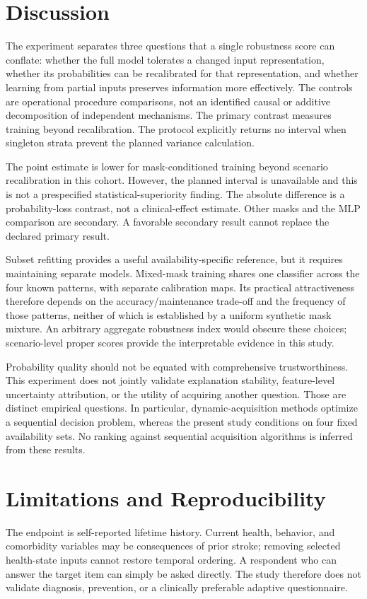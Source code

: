 \documentclass[conference,letterpaper]{IEEEtran}
\begin{document}
\section{Discussion}
The experiment separates three questions that a single robustness score can conflate: whether the full model tolerates a changed input representation, whether its probabilities can be recalibrated for that representation, and whether learning from partial inputs preserves information more effectively. The controls are operational procedure comparisons, not an identified causal or additive decomposition of independent mechanisms. The primary contrast measures training beyond recalibration. The protocol explicitly returns no interval when singleton strata prevent the planned variance calculation.

The point estimate is lower for mask-conditioned training beyond scenario recalibration in this cohort. However, the planned interval is unavailable and this is not a prespecified statistical-superiority finding. The absolute difference is a probability-loss contrast, not a clinical-effect estimate. Other masks and the MLP comparison are secondary. A favorable secondary result cannot replace the declared primary result.

Subset refitting provides a useful availability-specific reference, but it requires maintaining separate models. Mixed-mask training shares one classifier across the four known patterns, with separate calibration maps. Its practical attractiveness therefore depends on the accuracy/maintenance trade-off and the frequency of those patterns, neither of which is established by a uniform synthetic mask mixture. An arbitrary aggregate robustness index would obscure these choices; scenario-level proper scores provide the interpretable evidence in this study.

Probability quality should not be equated with comprehensive trustworthiness. This experiment does not jointly validate explanation stability, feature-level uncertainty attribution, or the utility of acquiring another question. Those are distinct empirical questions. In particular, dynamic-acquisition methods optimize a sequential decision problem, whereas the present study conditions on four fixed availability sets. No ranking against sequential acquisition algorithms is inferred from these results.

\section{Limitations and Reproducibility}
The endpoint is self-reported lifetime history. Current health, behavior, and comorbidity variables may be consequences of prior stroke; removing selected health-state inputs cannot restore temporal ordering. A respondent who can answer the target item can simply be asked directly. The study therefore does not validate diagnosis, prevention, or a clinically preferable adaptive questionnaire.
\end{document}

